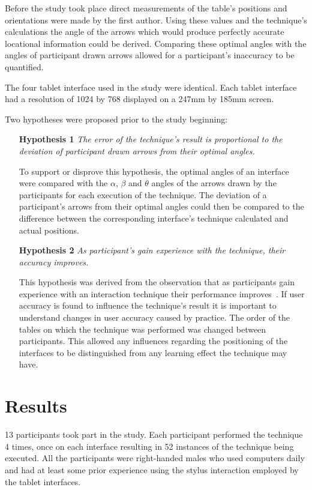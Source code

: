 \documentclass{bmcart}
\begin{document}
Before the study took place direct measurements of the table's positions and orientations were made by the first author.
Using these values and the technique's calculations the angle of the arrows which would produce perfectly accurate locational information could be derived.
Comparing these optimal angles with the angles of participant drawn arrows allowed for a participant's inaccuracy to be quantified.

The four tablet interface used in the study were identical.
Each tablet interface had a resolution of 1024 by 768 displayed on a 247mm by 185mm screen.

Two hypotheses were proposed prior to the study beginning:

\begin{itemize}
\item[\textbf{Hypothesis 1}] {\emph{The error of the technique's result is proportional to the deviation of participant drawn arrows from their optimal angles.}}

To support or disprove this hypothesis, the optimal angles of an interface were compared with the $\alpha$, $\beta$ and $\theta$ angles of the arrows drawn by the participants for each execution of the technique.
The deviation of a participant's arrows from their optimal angles could then be compared to the difference between the corresponding interface's technique calculated and actual positions.

\item[\textbf{Hypothesis 2}] {\emph{As participant's gain experience with the technique, their accuracy improves.}}

This hypothesis was derived from the observation that as participants gain experience with an interaction technique their performance improves~\cite{Constantine1999}.
If user accuracy is found to influence the technique's result it is important to understand changes in user accuracy caused by practice.
The order of the tables on which the technique was performed was changed between participants.
This allowed any influences regarding the positioning of the interfaces to be distinguished from any learning effect the technique may have.
\end{itemize}


\section*{Results}\label{sec:results}  

13 participants took part in the study.
Each participant performed the technique 4 times, once on each interface resulting in 52 instances of the technique being executed.
All the participants were right-handed males who used computers daily and had at least some prior experience using the stylus interaction employed by the tablet interfaces.
\end{document}
